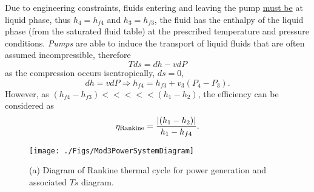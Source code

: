      Due to engineering constraints, fluids entering and leaving the pump \underline{must be} at liquid phase, thus $h_{4}=h_{f4}$ and $h_{3}=h_{f3}$, \ie the fluid has the enthalpy of the liquid phase (from the saturated fluid table) at the prescribed temperature and pressure conditions. {\it Pumps} are able to induce the transport of liquid fluids that are often assumed incompressible, therefore
          \begin{displaymath}
                Tds = dh - v dP
          \end{displaymath}
as the compression occurs isentropically, \ie $ds=0$,
          \begin{displaymath}
                dh = v dP \Rightarrow h_{f4} = h_{f3} + v_{3}\left(P_{4}-P_{3}\right).
          \end{displaymath}
However, as $\left(h_{f4}-h_{f3}\right) <<<<< \left(h_{1}-h_{2}\right)$, the efficiency can be considered as
           \begin{displaymath}
               \eta_{\text{Rankine}} = \displaystyle\frac{\left|\left(h_{1}-h_{2}\right)\right|}{h_{1}-h_{f4}}.
           \end{displaymath}     
%
   \begin{figure}[h]
      \begin{center}
         \texttt{[image: ./Figs/Mod3PowerSystemDiagram]}
      \end{center}
      \caption{ (a) Diagram of Rankine thermal cycle for power generation and associated $Ts$ diagram.}\label{Mod03Fig04}
   \end{figure}


\clearpage

